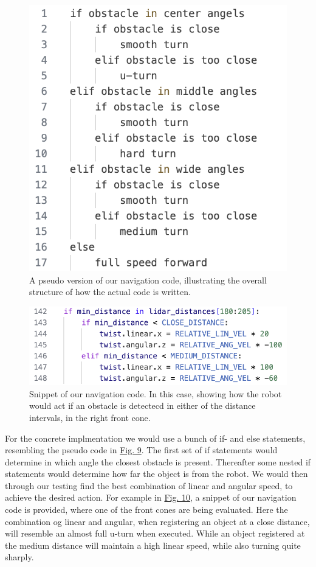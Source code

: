 \documentclass[conference]{IEEEtran}
\begin{document}
\begin{figure}[t]
    \centerline{\includegraphics[width=0.75\columnwidth\hspace{-0.5cm}]{Pictures/Pseudo.png}}
    \caption{A pseudo version of our navigation code, illustrating the overall structure of how the actual code is written.}
    \label{sec:pseudo}
    \end{figure}
\begin{figure}[b]
    \centerline{\includegraphics[width=1.0\columnwidth\hspace{0.0cm}]{Pictures/Navigation.png}}
    \caption{Snippet of our navigation code. 
    In this case, showing how the robot would act if an obstacle is detectecd in either of the distance intervals, in the right front cone.}
    \label{sec:navigation}
    \end{figure}

For the concrete implmentation we would use a bunch of if- and else statements, resembling the pseudo code in \href{sec:pseudo}{Fig. 9}.
The first set of if statements would determine in which angle the closest obstacle is present.
Thereafter some nested if statements would determine how far the object is from the robot.
We would then through our testing find the best combination of linear and angular speed, to achieve the desired action.
For example in \href{sec:navigation}{Fig. 10}, a snippet of our navigation code is provided, where one of the front cones are being evaluated. 
Here the combination og linear and angular, when registering an object at a close distance, will resemble an almost full u-turn when executed.
While an object registered at the medium distance will maintain a high linear speed, while also turning quite sharply.
\end{document}
